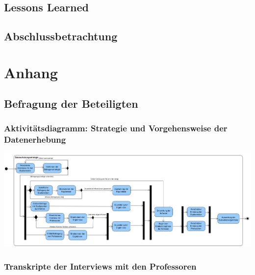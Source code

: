 \documentclass[bibliography=totoc,listof=totoc,BCOR=5mm,DIV=12,oneside]{scrbook}
\begin{document}
\section{Lessons Learned}
\section{Abschlussbetrachtung}

\nocite{*}
\printbibliography

\newpage
\appendix
\chapter{Anhang}

\newpage
\section{Befragung der Beteiligten}

\newpage
\subsection{Aktivitätsdiagramm: Strategie und Vorgehensweise der Datenerhebung}
\label{anhang:datenerhebungStrategieAktivitätsdiagramm}

\newpage
\pagestyle{empty}%
\begin{center}
\includegraphics[scale=0.6, angle=90]{Bilder/Diagramme/AnalysestrategieDetails.png}
\end{center}

\newpage
\subsection{Transkripte der Interviews mit den Professoren}
\label{anhang:interviewProfessorenTranskripte}





\end{document}
